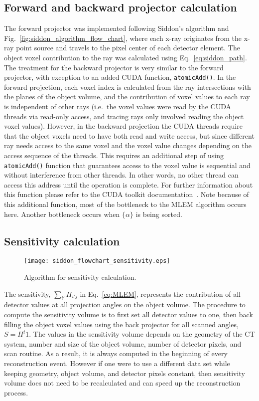 \subsection{Forward and backward projector calculation}
The forward projector was implemented following Siddon's algorithm and Fig.~\ref{fig:siddon_algorithm_flow_chart}, where each x-ray originates from the x-ray point source and travels to the pixel center of each detector element.  The object voxel contribution to the ray was calculated using Eq.~\ref{eq:siddon_path}.  The treatment for the backward projector is very similar to the forward projector, with exception to an added CUDA function, \texttt{atomicAdd()}.  In the forward projection, each voxel index is calculated from the ray intersections with the planes of the object volume, and the contribution of voxel values to each ray is independent of other rays (i.e.\ the voxel values were read by the CUDA threads via read-only access, and tracing rays only involved reading the object voxel values).  However, in the backward projection the CUDA threads require that the object voxels need to have both read and write access, but since different ray needs access to the same voxel and the voxel value changes depending on the access sequence of the threads.  This requires an additional step of using \texttt{atomicAdd()} function that guarantees access to the voxel value is sequential and without interference from other threads.  In other words, no other thread can access this address until the operation is complete.  For further information about this function please refer to the CUDA toolkit documentation~\citep{Cudatoolkit}.  Note because of this additional function, most of the bottleneck to the MLEM algorithm occurs here.  Another bottleneck occurs when $\{ \alpha \}$ is being sorted.

\subsection{Sensitivity calculation}

\begin{figure}[h]
\centering
\texttt{[image: siddon\_flowchart\_sensitivity.eps]}
\caption{Algorithm for sensitivity calculation.}
\label{fig:sensitivityslices}
\end{figure}

The sensitivity, $\sum\limits_{i'} H_{i'j}$ in Eq.~\ref{eq:MLEM}, represents the contribution of all detector values at all projection angles on the object volume.  The procedure to compute the sensitivity volume is to first set all detector values to one, then back filling the object voxel values using the back projector for all scanned angles, $S = H^t 1$.  The values in the sensitivity volume depends on the geometry of the CT system, number and size of the object volume, number of detector pixels, and scan routine.  As a result, it is always computed in the beginning of every reconstruction event.  However if one were to use a different data set while keeping geometry, object volume, and detector pixels constant, then sensitivity volume does not need to be recalculated and can speed up the reconstruction process.

